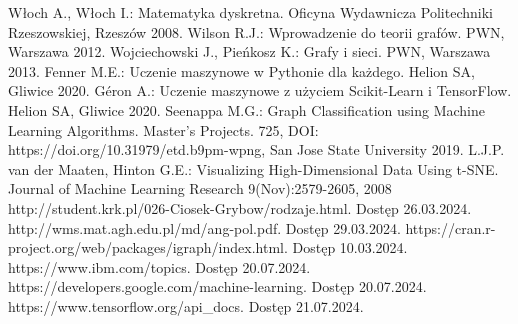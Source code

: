 
\begin{thebibliography}{4}
     Włoch A., Włoch I.: Matematyka dyskretna. Oficyna Wydawnicza Politechniki Rzeszowskiej, Rzeszów 2008.
     Wilson R.J.: Wprowadzenie do teorii grafów. PWN, Warszawa 2012.
     Wojciechowski J., Pieńkosz K.: Grafy i sieci. PWN, Warszawa 2013.
     Fenner M.E.: Uczenie maszynowe w Pythonie dla każdego. Helion SA, Gliwice 2020.
     Géron A.: Uczenie maszynowe z użyciem Scikit-Learn i TensorFlow. Helion SA, Gliwice 2020.
     Seenappa M.G.: Graph Classification using Machine Learning Algorithms. Master's Projects. 725, DOI: https://doi.org/10.31979/etd.b9pm-wpng, San Jose State University 2019.
     L.J.P. van der Maaten, Hinton G.E.: Visualizing High-Dimensional Data Using t-SNE. Journal of Machine Learning Research 9(Nov):2579-2605, 2008
     http://student.krk.pl/026-Ciosek-Grybow/rodzaje.html. Dostęp 26.03.2024.
     http://wms.mat.agh.edu.pl/\texttildelow md/ang-pol.pdf. Dostęp 29.03.2024. 
     https://cran.r-project.org/web/packages/igraph/index.html. Dostęp 10.03.2024.
     https://www.ibm.com/topics. Dostęp 20.07.2024.
     https://developers.google.com/machine-learning. Dostęp 20.07.2024.
     https://www.tensorflow.org/api\_docs. Dostęp 21.07.2024.
\end{thebibliography}